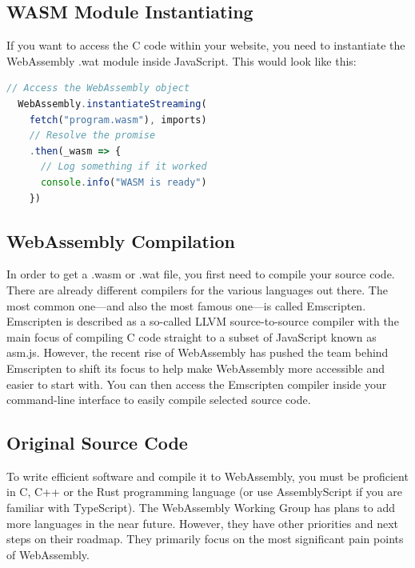 \documentclass[10pt]{article}
\begin{document}
\begin{sloppypar}
  \subsection{WASM Module Instantiating}
  \label{sec:webassembly-module-instantiating}

  If you want to access the C code within your website, you need to instantiate the WebAssembly .wat module inside JavaScript. This would look like this:

  \vspace{7pt}
  \begin{lstlisting}[language=JavaScript, caption=Instantiate the .wasm module in JavaScript., label=lst:javascript-example]
  // Access the WebAssembly object
  WebAssembly.instantiateStreaming(
    fetch("program.wasm"), imports)
    // Resolve the promise
    .then(_wasm => {
      // Log something if it worked
      console.info("WASM is ready")
    })\end{lstlisting}

  \subsection{WebAssembly Compilation}
  \label{sec:webassembly-compilation}

  In order to get a .wasm or .wat file, you first need to compile your source code. There are already different compilers for the various languages out there. The most common one—and also the most famous one—is called Emscripten. Emscripten is described as a so-called LLVM source-to-source compiler with the main focus of compiling C code straight to a subset of JavaScript known as asm.js. However, the recent rise of WebAssembly has pushed the team behind Emscripten to shift its focus to help make WebAssembly more accessible and easier to start with. You can then access the Emscripten compiler inside your command-line interface to easily compile selected source code.

  \subsection{Original Source Code}
  \label{sec:original-source-code}

  To write efficient software and compile it to WebAssembly, you must be proficient in C, C++ or the Rust programming language (or use AssemblyScript if you are familiar with TypeScript). The WebAssembly Working Group has plans to add more languages in the near future. However, they have other priorities and next steps on their roadmap. They primarily focus on the most significant pain points of WebAssembly.


\end{sloppypar}
\end{document}
